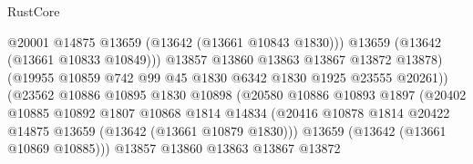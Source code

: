 \begin{lexlean}{RustCore}
\begin{coremodule}
                                            @20001
                                            @14875
                                            @13659
                                            (@13642 (@13661 @10843 @1830)))
                                          @13659
                                          (@13642 (@13661 @10833 @10849)))
                                        @13857
                                        @13860
                                        @13863
                                        @13867
                                        @13872
                                        @13878)
                                      (@19955
                                        @10859
                                        @742
                                        @99
                                        @45
                                        @1830
                                        @6342
                                        @1830
                                        @1925
                                        @23555
                                        @20261))
                                    (@23562
                                      @10886
                                      @10895
                                      @1830
                                      @10898
                                      (@20580
                                        @10886
                                        @10893
                                        @1897
                                        (@20402
                                          @10885
                                          @10892
                                          @1807
                                          @10868
                                          @1814
                                          @14834
                                          (@20416
                                            @10878
                                            @1814
                                            @20422
                                            @14875
                                            @13659
                                            (@13642 (@13661 @10879 @1830)))
                                          @13659
                                          (@13642 (@13661 @10869 @10885)))
                                        @13857
                                        @13860
                                        @13863
                                        @13867
                                        @13872

\end{coremodule}
\end{lexlean}
